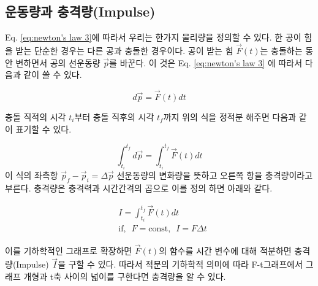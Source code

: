 



\subsection{운동량과 충격량(Impulse)}

\begin{flushleft}
  
Eq. \ref{eq:newton's law 3}에 따라서 우리는 한가지 물리량을 정의할 수 있다. 한 공이 힘을 받는 단순한 경우는 다른 
공과 충돌한 경우이다. 공이 받는 힘 $\vec{F}(t)$는 충돌하는 동안 변하면서 공의 선운동량 $\vec{p}$를 바꾼다. 이 것은 Eq. \ref{eq:newton's law 3}
에 따라서 다음과 같이 쓸 수 있다. 



\begin{equation}
  d\vec{p}=\vec{F}(t)dt
\end{equation}

충돌 직적의 시각 $t_i$부터 충돌 직후의 시각 $t_f$까지 위의 식을 정적분 해주면 다음과 같이 표기할 수 있다. 

\begin{equation}
  \int_{t_i}^{t_f} d\vec{p}= \int_{t_i}^{t_f} \vec{F}(t)dt
\end{equation}
이 식의 좌측항 $\vec{p}_f-\vec{p}_i= \Delta\vec{p}$ 선운동량의 변화량을 뜻하고 오른쪽 항을 충격량이라고 부른다. 충격량은 
충격력과 시간간격의 곱으로 이를 정의 하면 아래와 같다. 

\begin{defn}[충격량의 정의]
  \begin{align}
 &I = \int_{t_i}^{t_f}\vec{F}(t)dt\\
 & \textrm{if}, \phantom{o} F=\textrm{const},\phantom{o}I=F \Delta t
\end{align}
\end{defn}
이를 기하학적인 그래프로 확장하면 $\vec{F}(t)$의 함수를 시간 변수에 대해 적분하면 충격량(Impulse) $\vec{I}$을 구할 수 있다.
따라서 적분의 기하학적 의미에 따라 F-t그래프에서 그래프 개형과 t축 사이의 넓이를 구한다면 충격량을 알 수 있다. 

\end{flushleft}

